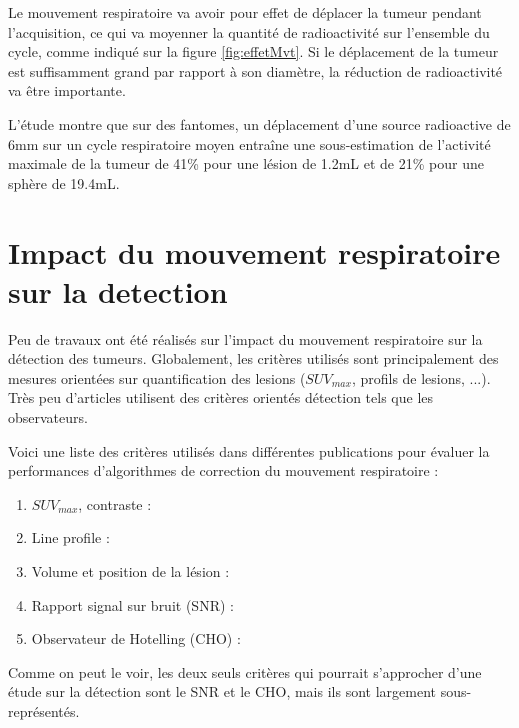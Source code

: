 Le mouvement respiratoire va avoir pour effet de déplacer la tumeur pendant l'acquisition, ce qui va moyenner la quantité de radioactivité sur l'ensemble du cycle, comme indiqué sur la figure \ref{fig:effetMvt}. Si le déplacement de la tumeur est suffisamment grand par rapport à son diamètre, la réduction de radioactivité va être importante.

L'étude \cite{boucher2004respiratory} montre que sur des fantomes, un déplacement d'une source radioactive de 6mm sur un cycle respiratoire moyen entraîne une sous-estimation de l'activité maximale de la tumeur de 41\% pour une lésion de 1.2mL et de 21\% pour une sphère de 19.4mL.


\section{Impact du mouvement respiratoire sur la detection}

Peu de travaux ont été réalisés sur l'impact du mouvement respiratoire sur la détection des tumeurs. Globalement, les critères utilisés sont principalement des mesures orientées sur quantification des lesions ($SUV_{max}$, profils de lesions, ...). Très peu d'articles utilisent des critères orientés détection tels que les observateurs.

Voici une liste des critères utilisés dans différentes publications pour évaluer la performances d'algorithmes de correction du mouvement respiratoire :

\begin{enumerate}
 \item  $SUV_{max}$, contraste : \cite{GuopingChang2010Implementation} \cite{lamare2007list} \cite{nehmeh2002effect} \cite{detorie2008quantitative}
 \item Line profile : \cite{GuopingChang2010Implementation} \cite{Thielemans2006Lesion} \cite{lamare2007list}
 \item Volume et position de la lésion : \cite{GuopingChang2010Implementation} \cite{lamare2007list} \cite{nehmeh2002effect}
 \item Rapport signal sur bruit (SNR) : \cite{GuopingChang2010Implementation}
 \item Observateur de Hotelling (CHO) : \cite{Thielemans2006Lesion}
\end{enumerate}

Comme on peut le voir, les deux seuls critères qui pourrait s'approcher d'une étude sur la détection sont le SNR et le CHO, mais ils sont largement sous-représentés. 

